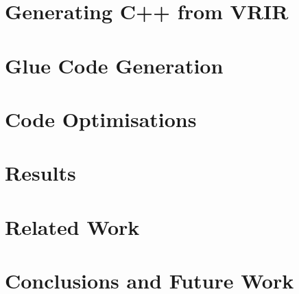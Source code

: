 \documentclass[MSc,twoside,openright]{Thesis}
\begin{document}
\chapter{Generating C++ from VRIR} \label{chap:vrirBackend}

\chapter{Glue Code Generation} \label{chap:glueCode}

\chapter{Code Optimisations} \label{chap:codeOptimise}

\chapter{Results} \label{chap:results}

\chapter{Related Work} \label{chap:Related}


\chapter{Conclusions and Future Work} \label{chap:Conclusions}




%

%



\appendix %


%
%
\end{document}
